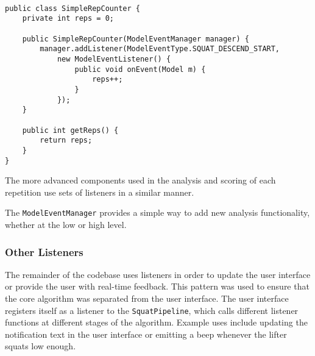 \begin{lstlisting}[style=javastyle]

public class SimpleRepCounter {
	private int reps = 0;

	public SimpleRepCounter(ModelEventManager manager) {
		manager.addListener(ModelEventType.SQUAT_DESCEND_START,
			new ModelEventListener() {
				public void onEvent(Model m) {
					reps++;
				}
			});
	}

	public int getReps() {
		return reps;
	}
}

\end{lstlisting}

The more advanced components used in the analysis and scoring of each repetition use sets of listeners in a similar manner.

The \verb!ModelEventManager! provides a simple way to add new analysis functionality, whether at the low or high level.

\subsubsection{Other Listeners}

The remainder of the codebase uses listeners in order to update the user interface or provide the user with real-time feedback. This pattern was used to ensure that the core algorithm was separated from the user interface. The user interface registers itself as a listener to the \verb!SquatPipeline!, which calls different listener functions at different stages of the algorithm. Example uses include updating the notification text in the user interface or emitting a beep whenever the lifter squats low enough.